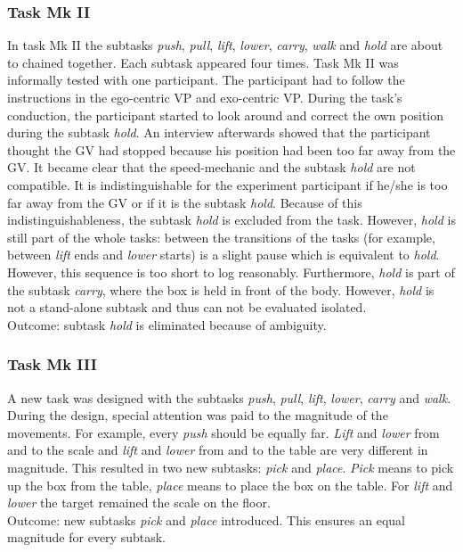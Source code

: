 \subsubsection{Task Mk II}
In task Mk II the subtasks \textit{push}, \textit{pull}, \textit{lift}, \textit{lower}, \textit{carry}, \textit{walk} and \textit{hold} are about to chained together. Each subtask appeared four times. Task Mk II was informally tested with one participant. The participant had to follow the instructions in the ego-centric VP and exo-centric VP. During the task's conduction, the participant started to look around and correct the own position during the subtask \textit{hold}. An interview afterwards showed that the participant thought the GV had stopped because his position had been too far away from the GV. It became clear that the speed-mechanic and the subtask \textit{hold} are not compatible. It is indistinguishable for the experiment participant if he/she is too far away from the GV or if it is the subtask \textit{hold}. Because of this indistinguishableness, the subtask \textit{hold} is excluded from the task. However, \textit{hold} is still part of the whole tasks: between the transitions of the tasks (for example, between \textit{lift} ends and \textit{lower} starts) is a slight pause which is equivalent to \textit{hold}. However, this sequence is too short to log reasonably. Furthermore, \textit{hold} is part of the subtask \textit{carry}, where the box is held in front of the body. However, \textit{hold} is not a stand-alone subtask and thus can not be evaluated isolated.\\
Outcome: subtask \textit{hold} is eliminated because of ambiguity.

\subsubsection{Task Mk III}
A new task was designed with the subtasks \textit{push}, \textit{pull}, \textit{lift}, \textit{lower}, \textit{carry} and \textit{walk}. During the design, special attention was paid to the magnitude of the movements. For example, every \textit{push} should be equally far. \textit{Lift} and \textit{lower} from and to the scale and \textit{lift} and \textit{lower} from and to the table are very different in magnitude. This resulted in two new subtasks: \textit{pick} and \textit{place}. \textit{Pick} means to pick up the box from the table, \textit{place} means to place the box on the table. For \textit{lift} and \textit{lower} the target remained the scale on the floor.\\
Outcome: new subtasks \textit{pick} and \textit{place} introduced. This ensures an equal magnitude for every subtask.

